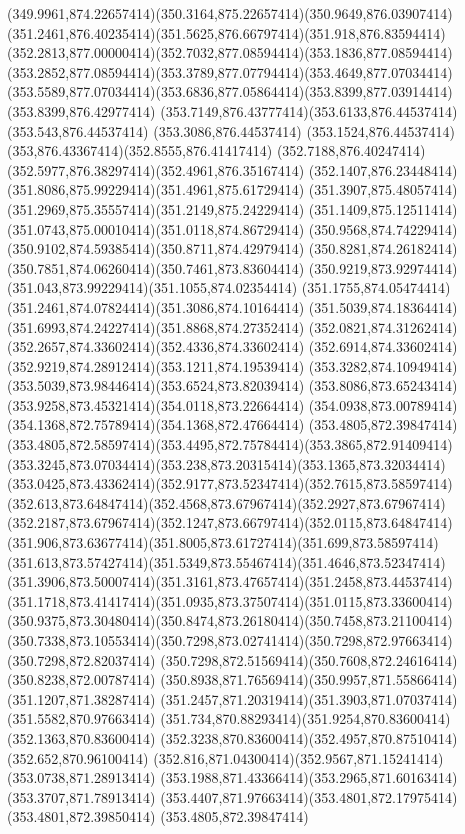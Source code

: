 {{	\curveto(349.9961,874.22657414)(350.3164,875.22657414)(350.9649,876.03907414)
	\curveto(351.2461,876.40235414)(351.5625,876.66797414)(351.918,876.83594414)
	\curveto(352.2813,877.00000414)(352.7032,877.08594414)(353.1836,877.08594414)
	\curveto(353.2852,877.08594414)(353.3789,877.07794414)(353.4649,877.07034414)
	\curveto(353.5589,877.07034414)(353.6836,877.05864414)(353.8399,877.03914414)
	\lineto(353.8399,876.42977414)
	\curveto(353.7149,876.43777414)(353.6133,876.44537414)(353.543,876.44537414)
	\lineto(353.3086,876.44537414)
	\curveto(353.1524,876.44537414)(353,876.43367414)(352.8555,876.41417414)
	\curveto(352.7188,876.40247414)(352.5977,876.38297414)(352.4961,876.35167414)
	\curveto(352.1407,876.23448414)(351.8086,875.99229414)(351.4961,875.61729414)
	\curveto(351.3907,875.48057414)(351.2969,875.35557414)(351.2149,875.24229414)
	\curveto(351.1409,875.12511414)(351.0743,875.00010414)(351.0118,874.86729414)
	\curveto(350.9568,874.74229414)(350.9102,874.59385414)(350.8711,874.42979414)
	\curveto(350.8281,874.26182414)(350.7851,874.06260414)(350.7461,873.83604414)
	\curveto(350.9219,873.92974414)(351.043,873.99229414)(351.1055,874.02354414)
	\curveto(351.1755,874.05474414)(351.2461,874.07824414)(351.3086,874.10164414)
	\curveto(351.5039,874.18364414)(351.6993,874.24227414)(351.8868,874.27352414)
	\curveto(352.0821,874.31262414)(352.2657,874.33602414)(352.4336,874.33602414)
	\curveto(352.6914,874.33602414)(352.9219,874.28912414)(353.1211,874.19539414)
	\curveto(353.3282,874.10949414)(353.5039,873.98446414)(353.6524,873.82039414)
	\curveto(353.8086,873.65243414)(353.9258,873.45321414)(354.0118,873.22664414)
	\curveto(354.0938,873.00789414)(354.1368,872.75789414)(354.1368,872.47664414)
	\closepath
	\moveto(353.4805,872.39847414)
	\curveto(353.4805,872.58597414)(353.4495,872.75784414)(353.3865,872.91409414)
	\curveto(353.3245,873.07034414)(353.238,873.20315414)(353.1365,873.32034414)
	\curveto(353.0425,873.43362414)(352.9177,873.52347414)(352.7615,873.58597414)
	\curveto(352.613,873.64847414)(352.4568,873.67967414)(352.2927,873.67967414)
	\curveto(352.2187,873.67967414)(352.1247,873.66797414)(352.0115,873.64847414)
	\curveto(351.906,873.63677414)(351.8005,873.61727414)(351.699,873.58597414)
	\curveto(351.613,873.57427414)(351.5349,873.55467414)(351.4646,873.52347414)
	\curveto(351.3906,873.50007414)(351.3161,873.47657414)(351.2458,873.44537414)
	\curveto(351.1718,873.41417414)(351.0935,873.37507414)(351.0115,873.33600414)
	\curveto(350.9375,873.30480414)(350.8474,873.26180414)(350.7458,873.21100414)
	\curveto(350.7338,873.10553414)(350.7298,873.02741414)(350.7298,872.97663414)
	\lineto(350.7298,872.82037414)
	\curveto(350.7298,872.51569414)(350.7608,872.24616414)(350.8238,872.00787414)
	\curveto(350.8938,871.76569414)(350.9957,871.55866414)(351.1207,871.38287414)
	\curveto(351.2457,871.20319414)(351.3903,871.07037414)(351.5582,870.97663414)
	\curveto(351.734,870.88293414)(351.9254,870.83600414)(352.1363,870.83600414)
	\curveto(352.3238,870.83600414)(352.4957,870.87510414)(352.652,870.96100414)
	\curveto(352.816,871.04300414)(352.9567,871.15241414)(353.0738,871.28913414)
	\curveto(353.1988,871.43366414)(353.2965,871.60163414)(353.3707,871.78913414)
	\curveto(353.4407,871.97663414)(353.4801,872.17975414)(353.4801,872.39850414)
	\closepath
	\moveto(353.4805,872.39847414)
}
}

